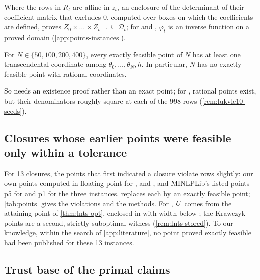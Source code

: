 Where the rows in $R_t$ are affine in $z_t$, an enclosure of the determinant of their coefficient matrix that excludes $0$, computed over boxes on which the coefficients are defined, proves $Z_0\times\dots\times Z_{t-1}\subseteq\mathcal{D}_t$; for  and , $\varphi_t$ is an inverse function on a proved domain (\cref{app:points-instances}).

\begin{proposition}\label{prop:pts-lindemann}
For $N\in\{50,100,200,400\}$, every exactly feasible point of $N$ has at least one transcendental coordinate among $\theta_0,\dots,\theta_N,h$.
In particular, $N$ has no exactly feasible point with rational coordinates.
\end{proposition}

So  needs an existence proof rather than an exact point; for , rational points exist, but their denominators roughly square at each of the 998 rows (\cref{rem:lukvle10-seeds}).

\subsection{Closures whose earlier points were feasible only within a tolerance}\label{sec:points-former}

For 13 closures, the points that first indicated a closure violate rows slightly: our own points computed in floating point for ,  and , and MINLPLib's listed points p5 for  and p1 for the three  instances.
 replaces each by an exactly feasible point; \cref{tab:points} gives the violations and the methods.
For , $U$ comes from the attaining point of \cref{thm:lnts-opt}, enclosed in  with width below ; the Krawczyk points are a second, strictly suboptimal witness (\cref{rem:lnts-stored}).
To our knowledge, within the search of \cref{app:literature}, no point proved exactly feasible had been published for these 13 instances.



\subsection{Trust base of the primal claims}\label{sec:points-trust}

